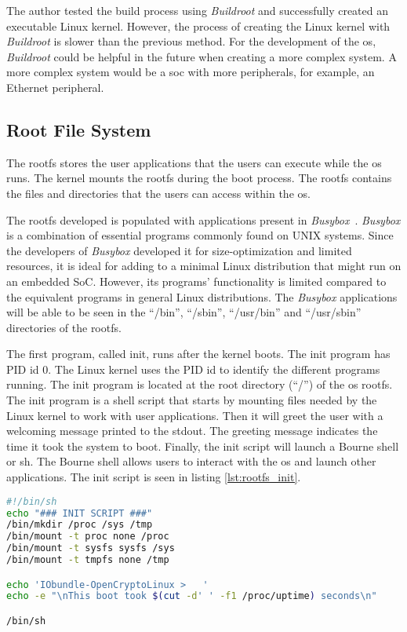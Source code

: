 The author tested the build process using \textit{Buildroot} and successfully created an executable Linux kernel. However, the process of creating the Linux kernel with \textit{Buildroot} is slower than the previous method. For the development of the \acrshort{os}, \textit{Buildroot} could be helpful in the future when creating a more complex system. A more complex system would be a \acrshort{soc} with more peripherals, for example, an Ethernet peripheral.

\subsection{Root File System}
The \acrfull{rootfs} stores the user applications that the users can execute while the \acrshort{os} runs. The kernel mounts the \acrshort{rootfs} during the boot process. The \acrshort{rootfs} contains the files and directories that the users can access within the \acrshort{os}.

The \acrshort{rootfs} developed is populated with applications present in \textit{Busybox}~\cite{busybox}. \textit{Busybox} is a combination of essential programs commonly found on UNIX systems. Since the developers of \textit{Busybox} developed it for size-optimization and limited resources, it is ideal for adding to a minimal Linux distribution that might run on an embedded SoC. However, its programs' functionality is limited compared to the equivalent programs in general Linux distributions. The \textit{Busybox} applications will be able to be seen in the \enquote{/bin}, \enquote{/sbin}, \enquote{/usr/bin} and \enquote{/usr/sbin} directories of the \acrshort{rootfs}.

The first program, called init, runs after the kernel boots. The init program has PID id 0. The Linux kernel uses the PID id to identify the different programs running. The init program is located at the root directory (\enquote{/}) of the \acrshort{os} \acrlong{rootfs}. The init program is a shell script that starts by mounting files needed by the Linux kernel to work with user applications. Then it will greet the user with a welcoming message printed to the stdout. The greeting message indicates the time it took the system to boot. Finally, the init script will launch a Bourne shell or sh. The Bourne shell allows users to interact with the \acrshort{os} and launch other applications. The init script is seen in listing \ref{lst:rootfs_init}.

\begin{lstlisting}[language=sh, caption={Init script.}, label=lst:rootfs_init]
#!/bin/sh
echo "### INIT SCRIPT ###"
/bin/mkdir /proc /sys /tmp
/bin/mount -t proc none /proc
/bin/mount -t sysfs sysfs /sys
/bin/mount -t tmpfs none /tmp

echo 'IObundle-OpenCryptoLinux >   '
echo -e "\nThis boot took $(cut -d' ' -f1 /proc/uptime) seconds\n"

/bin/sh    
\end{lstlisting}

